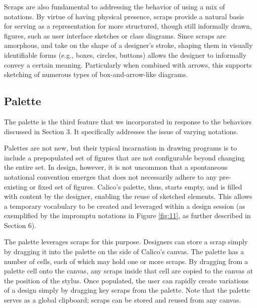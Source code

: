 Scraps are also fundamental to addressing the behavior of using a mix of notations. By virtue of having physical presence, scraps provide a natural basis for serving as a representation for more structured, though still informally drawn, figures, such as user interface sketches or class diagrams. Since scraps are amorphous, and take on the shape of a designer's stroke, shaping them in visually identifiable forms (e.g., boxes, circles, buttons) allows the designer to informally convey a certain meaning. Particularly when combined with arrows, this supports sketching of numerous types of box-and-arrow-like diagrams. 

\subsection {Palette}
\label{calico:4}

The palette is the third feature that we incorporated in response to the behaviors discussed in Section 3. It specifically addresses the issue of varying notations.

Palettes are not new, but their typical incarnation in drawing programs is to include a prepopulated set of figures that are not configurable beyond changing the entire set. In design, however, it is not uncommon that a spontaneous notational convention emerges that does not necessarily adhere to any pre-existing or fixed set of figures. Calico's palette, thus, starts empty, and is filled with content by the designer, enabling the reuse of sketched elements. This allows a temporary vocabulary to be created and leveraged within a design session (as exemplified by the impromptu notations in Figure \ref{fig:11}, as further described in Section 6). 

 
%

The palette leverages scraps for this purpose. Designers can store a scrap simply by dragging it into the palette on the side of Calico's canvas. The palette has a number of cells, each of which may hold one or more scraps. By dragging from a palette cell onto the canvas, any scraps inside that cell are copied to the canvas at the position of the stylus. Once populated, the user can rapidly create variations of a design simply by dragging key scraps from the palette.
Note that the palette serves as a global clipboard; scraps can be stored and reused from any canvas. 



